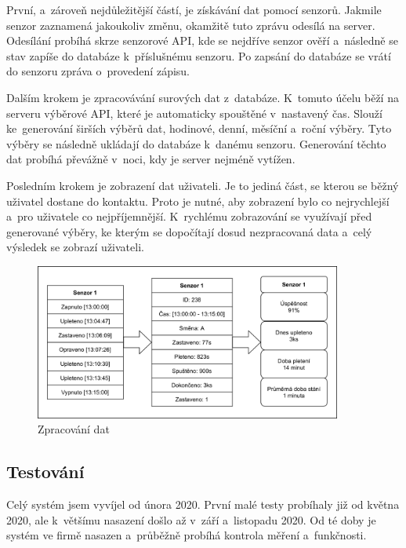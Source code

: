 \documentclass[12pt, a4paper]{article}
\begin{document}
První, a~zároveň nejdůležitější částí, je získávání dat pomocí senzorů.
Jakmile senzor zaznamená jakoukoliv změnu, okamžitě tuto zprávu odesílá na server.
Odesílání probíhá skrze senzorové API, kde se nejdříve senzor ověří a~následně se stav zapíše do databáze k~příslušnému senzoru.
Po zapsání do databáze se vrátí do senzoru zpráva o~provedení zápisu. 

Dalším krokem je zpracovávání surových dat z~databáze.
K~tomuto účelu běží na serveru výběrové API, které je automaticky spouštěné v~nastavený čas.
Slouží ke~generování širších výběrů dat, hodinové, denní, měsíční a~roční výběry.
Tyto výběry se následně ukládají do databáze k~danému senzoru.
Generování těchto dat probíhá převážně v~noci, kdy je server nejméně vytížen.

Posledním krokem je zobrazení dat uživateli.
Je to jediná část, se kterou se běžný uživatel dostane do kontaktu.
Proto je nutné, aby zobrazení bylo co nejrychlejší a~pro uživatele co nejpříjemnější.
K~rychlému zobrazování se využívají před generované výběry, ke kterým se dopočítají dosud nezpracovaná data a~celý výsledek se zobrazí uživateli.

\begin{figure}[t]
    \centering
    \includegraphics[width=0.9\textwidth]{img/Princip.png}
    \caption{Zpracování dat}
    \label{fig:princip}
\end{figure}


\subsection*{Testování}
Celý systém jsem vyvíjel od února 2020. První malé testy probíhaly již od května 2020, ale k~většímu nasazení došlo až v~září a~listopadu 2020.
Od té doby je systém ve firmě nasazen a~průběžně probíhá kontrola měření a~funkčnosti.
\end{document}
